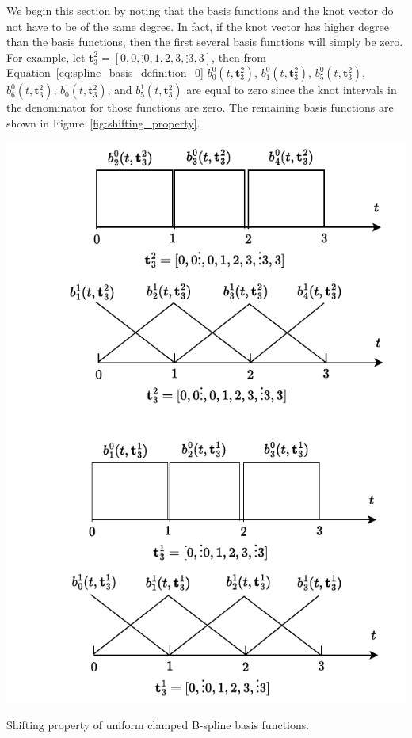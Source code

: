 We begin this section by noting that the basis functions and the knot vector do not have to be of the same degree.  In fact, if the knot vector has higher degree than the basis functions, then the first several basis functions will simply be zero.  
For example, let $\mathbf{t}_3^2 = [0, 0,\vdots 0, 1, 2, 3, \vdots 3, 3]$, then from Equation~\eqref{eq:spline_basis_definition_0} $b_0^0(t,  \mathbf{t}_3^2)$, $b_1^0(t,  \mathbf{t}_3^2)$, $b_5^0(t,  \mathbf{t}_3^2)$, $b_6^0(t,  \mathbf{t}_3^2)$, $b_0^1(t,  \mathbf{t}_3^2)$, and $b_5^1(t,  \mathbf{t}_3^2)$ are equal to zero since the knot intervals in the denominator for those functions are zero.  The remaining basis functions are shown in Figure~\ref{fig:shifting_property}.
\begin{marginfigure}[0in]
  \includegraphics[width=\linewidth]{./chap5_trajectory_planning/figures/shifting_property.drawio}
  \caption{Shifting property of uniform clamped B-spline basis functions.}
  \label{fig:shifting_property}  
\end{marginfigure}
